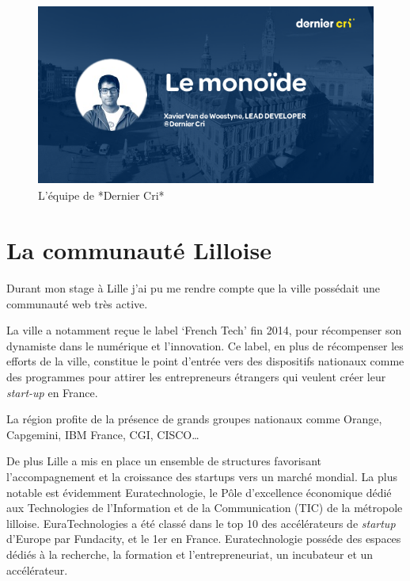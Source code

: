 \begin{figure}[h]
  \centering
  \includegraphics[height=6cm]{figures/blog.png}
  \caption{L'équipe de *Dernier Cri*}
\end{figure}

\newpage

\section{La communauté Lilloise}\label{la-communautuxe9-lilloise}

Durant mon stage à Lille j'ai pu me rendre compte que la ville possédait
une communauté web très active.

\bigskip

La ville a notamment reçue le label `French Tech' fin 2014, pour
récompenser son dynamiste dans le numérique et l'innovation. Ce label,
en plus de récompenser les efforts de la ville, constitue le point
d'entrée vers des dispositifs nationaux comme des programmes pour
attirer les entrepreneurs étrangers qui veulent créer leur
\emph{start-up} en France.

\bigskip

La région profite de la présence de grands groupes nationaux comme
Orange, Capgemini, IBM France, CGI, CISCO\ldots{}

\bigskip

De plus Lille a mis en place un ensemble de structures favorisant
l'accompagnement et la croissance des startups vers un marché mondial.
La plus notable est évidemment Euratechnologie, le Pôle d'excellence
économique dédié aux Technologies de l'Information et de la
Communication (TIC) de la métropole lilloise. EuraTechnologies a été
classé dans le top 10 des accélérateurs de \emph{startup} d'Europe par
Fundacity, et le 1er en France. Euratechnologie posséde des espaces
dédiés à la recherche, la formation et l'entrepreneuriat, un incubateur
et un accélérateur.

